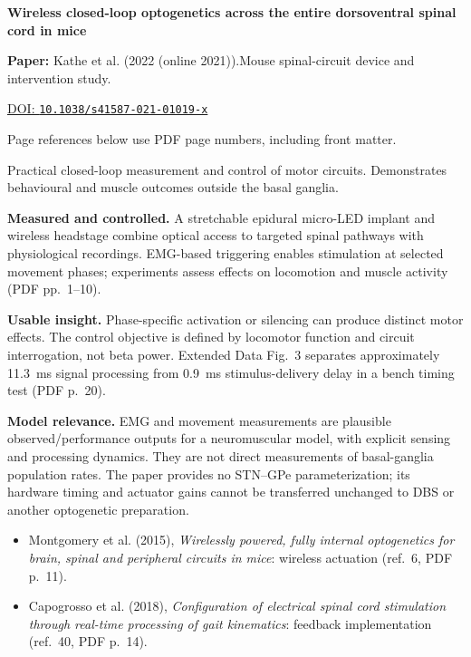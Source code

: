 

{\Large\bfseries Wireless closed-loop optogenetics across the entire dorsoventral spinal cord in mice\par}

\textbf{Paper:} Kathe et al. (2022 (online 2021)).\quad Mouse spinal-circuit device and intervention study.\par
\href{https://doi.org/10.1038/s41587-021-01019-x}{DOI: \nolinkurl{10.1038/s41587-021-01019-x}}\par
{\footnotesize Page references below use PDF page numbers, including front matter.}

Practical closed-loop measurement and control of motor circuits. Demonstrates behavioural and muscle outcomes outside the basal ganglia.

\textbf{Measured and controlled.} A stretchable epidural micro-LED implant and wireless headstage combine optical access to targeted spinal pathways with physiological recordings. EMG-based triggering enables stimulation at selected movement phases; experiments assess effects on locomotion and muscle activity (PDF pp.~1--10).

\textbf{Usable insight.} Phase-specific activation or silencing can produce distinct motor effects. The control objective is defined by locomotor function and circuit interrogation, not beta power. Extended Data Fig.~3 separates approximately 11.3~ms signal processing from 0.9~ms stimulus-delivery delay in a bench timing test (PDF p.~20).

\textbf{Model relevance.} EMG and movement measurements are plausible observed/performance outputs for a neuromuscular model, with explicit sensing and processing dynamics. They are not direct measurements of basal-ganglia population rates. The paper provides no STN--GPe parameterization; its hardware timing and actuator gains cannot be transferred unchanged to DBS or another optogenetic preparation.

\begin{itemize}
\item Montgomery et al. (2015), \emph{Wirelessly powered, fully internal optogenetics for brain, spinal and peripheral circuits in mice}: wireless actuation (ref.~6, PDF p.~11).
\item Capogrosso et al. (2018), \emph{Configuration of electrical spinal cord stimulation through real-time processing of gait kinematics}: feedback implementation (ref.~40, PDF p.~14).
\end{itemize}


